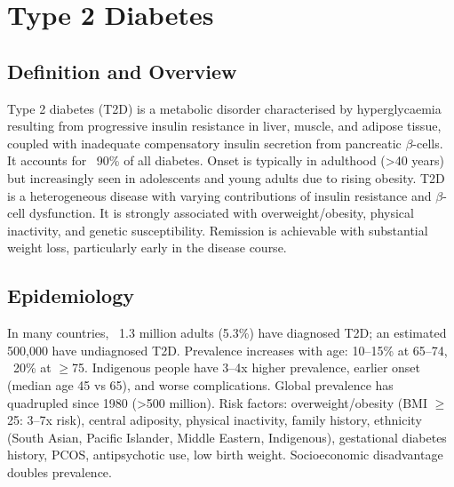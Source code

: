 \chapter{Type 2 Diabetes}

\section*{Definition and Overview}
Type 2 diabetes (T2D) is a metabolic disorder characterised by hyperglycaemia resulting from progressive insulin resistance in liver, muscle, and adipose tissue, coupled with inadequate compensatory insulin secretion from pancreatic $\beta$-cells. It accounts for ~90\% of all diabetes. Onset is typically in adulthood (>40 years) but increasingly seen in adolescents and young adults due to rising obesity. T2D is a heterogeneous disease with varying contributions of insulin resistance and $\beta$-cell dysfunction. It is strongly associated with overweight/obesity, physical inactivity, and genetic susceptibility. Remission is achievable with substantial weight loss, particularly early in the disease course.

\section*{Epidemiology}
In many countries, ~1.3 million adults (5.3\%) have diagnosed T2D; an estimated 500,000 have undiagnosed T2D. Prevalence increases with age: 10--15\% at 65--74, ~20\% at $\ge$75. Indigenous people have 3--4x higher prevalence, earlier onset (median age 45 vs 65), and worse complications. Global prevalence has quadrupled since 1980 (>500 million). Risk factors: overweight/obesity (BMI $\ge$25: 3--7x risk), central adiposity, physical inactivity, family history, ethnicity (South Asian, Pacific Islander, Middle Eastern, Indigenous), gestational diabetes history, PCOS, antipsychotic use, low birth weight. Socioeconomic disadvantage doubles prevalence.

